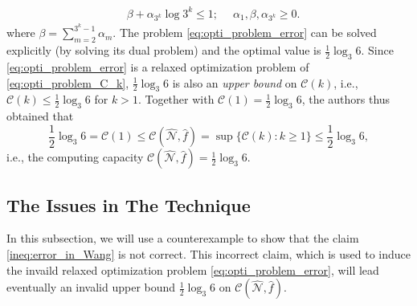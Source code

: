 \documentclass[11pt,draftclsnofoot,onecolumn]{IEEEtran}
\begin{document}
\begin{journalonly}
{\begin{equation}
\begin{split}
		&\beta+\alpha_{3^{k}}\log3^{k}\leq 1; \quad\;\alpha_{1},\beta,\alpha_{3^{k}}\geq 0.
	\end{split}\label{eq:opti_problem_error}
\end{equation}
where $\beta=\sum_{m=2}^{3^{k}-1}\alpha_{m}$. The problem \eqref{eq:opti_problem_error} can be solved explicitly (by solving its dual problem) and the optimal value is $\frac{1}{2}\log_{3}6$. Since \eqref{eq:opti_problem_error} is a relaxed optimization problem of \eqref{eq:opti_problem_C_k},  $\frac{1}{2}\log_{3}6$ is also an \emph{upper bound} on $\mathcal{C}(k)$, i.e., $\mathcal{C}(k)\leq \frac{1}{2}\log_{3}6$ for $ k>1$.
Together with $\mathcal{C}(1)=\frac{1}{2}\log_{3}6$, the authors thus obtained that
 \begin{equation*}
\frac{1}{2}\log_{3}6=\mathcal{C}(1)\leq\mathcal{C}(\widehat{\mathcal{N}},\widehat{f})=\sup\{\mathcal{C}(k):k\geq1\}\leq\frac{1}{2}\log_{3}6,
\end{equation*}
i.e., the computing capacity $\mathcal{C}(\widehat{\mathcal{N}},\widehat{f})=\frac{1}{2}\log_{3}6$.




\subsection{The Issues in The  Technique}\label{subsec:critical_error}

In this subsection, we will use a counterexample to show that the claim \eqref{ineq:error_in_Wang} is not correct.  This incorrect claim, which is used to induce the  invaild relaxed optimization problem \eqref{eq:opti_problem_error}, will lead eventually an invalid upper bound $\frac{1}{2}\log_{3}6$ on $\mathcal{C}(\widehat{\mathcal{N}},\widehat{f})$.

}
\end{journalonly}
\end{document}
